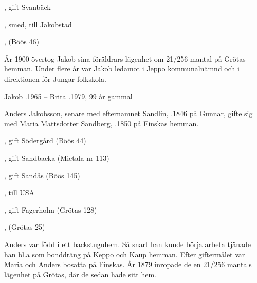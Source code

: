 \begin{jhchildren}
  \item {}
  \item {}
  \item {}, gift Svanbäck
  \item {}
  \item {}
  \item {}, smed, till Jakobstad
  \item {}, (Böös 46)
  \item {}
  \item {}
  \item {}
\end{jhchildren}
År 1900 övertog Jakob sina föräldrars lägenhet om  21/256 mantal på Grötas hemman. Under flere år var Jakob ledamot i Jeppo kommunalnämnd och i direktionen för Jungar folkskola.

Jakob .1965  --  Brita .1979, 99 år gammal


Anders Jakobsson, senare med efternamnet Sandlin, .1846 på Gunnar, gifte sig med Maria Mattsdotter Sandberg, .1850 på Finskas hemman.
\begin{jhchildren}
  \item {}
  \item {}, gift Södergård (Böös 44)
  \item {}, gift Sandbacka (Mietala nr 113)
  \item {}, gift Sandås (Böös 145)
  \item {}, till USA
  \item {}
  \item {}
  \item {}, gift Fagerholm (Grötas 128)
  \item {}, (Grötas 25)
\end{jhchildren}
Anders var född i ett backstuguhem. Så snart han kunde börja arbeta tjänade han bl.a som bonddräng på Keppo och Kaup hemman. Efter giftermålet var Maria och Anders bosatta på Finskas. År 1879 inropade de en 21/256 mantals lägenhet på Grötas, där de sedan hade sitt hem.

